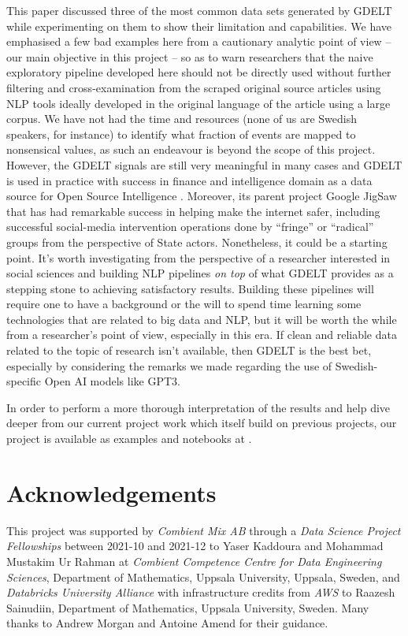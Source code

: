 \documentclass[a4, 11pt]{article}
\begin{document}
This paper discussed three of the most common data sets generated by GDELT while
experimenting on them to show their limitation and capabilities. We have emphasised a few bad examples here from a cautionary analytic point of view -- our main objective in this project -- so as to warn researchers that the naive exploratory pipeline developed here should not be directly used without further filtering and cross-examination from the scraped original source articles using NLP tools ideally developed in the original language of the article using a large corpus. We have not had the time and resources (none of us are Swedish speakers, for instance) to identify what fraction of events are mapped to nonsensical values, as such an endeavour is beyond the scope of this project. However, the GDELT signals are still very meaningful in many cases and GDELT is used in practice with success in finance and intelligence domain as a data source for Open Source Intelligence \cite{OSINT}. Moreover, its parent project Google JigSaw \cite{jigsaw} that has had remarkable success in helping make the internet safer, including successful social-media intervention operations done by ``fringe'' or ``radical'' groups from the perspective of State actors. 
Nonetheless, it could be a starting point. It's worth investigating from the
perspective of a researcher interested in social sciences and building NLP
pipelines {\em on top} of what GDELT provides as a stepping stone to achieving
satisfactory results. Building these pipelines will require one to have a background
or the will to spend time learning some technologies that are related to big
data and NLP, but it will be worth the while from a researcher's point of view,
especially in this era. If clean and reliable data related to the topic of
research isn't available, then GDELT is the best bet, especially by considering the remarks we made regarding the use of Swedish-specific Open AI models like GPT3. 

In order to perform a more thorough interpretation of the results and help dive deeper from our current project work which itself build on previous projects, our project is available as examples and notebooks at \cite{lamastex-gdelt-examples}. 
\section{Acknowledgements}

This project was supported by {\em Combient Mix AB} through a {\em Data Science Project Fellowships} between 2021-10 and 2021-12 to Yaser Kaddoura and Mohammad Mustakim Ur Rahman at {\em Combient Competence Centre for Data Engineering Sciences}, Department of Mathematics, Uppsala University, Uppsala, Sweden, and {\em Databricks University Alliance} with infrastructure credits from {\em AWS} to Raazesh Sainudiin, Department of Mathematics, Uppsala University, Sweden. Many thanks to Andrew Morgan and Antoine Amend for their guidance.
\end{document}
